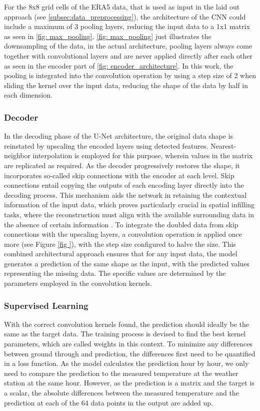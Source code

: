 For the 8x8 grid cells of the ERA5 data, that is used as input in the laid out approach (see \autoref{subsec:data_preprocessing}), the architecture of the CNN could include a maximum of 3 pooling layers, reducing the input data to a 1x1 matrix as seen in \autoref{fig: max_pooling}. \autoref{fig: max_pooling} just illustrates the downsampling of the data, in the actual architecture, pooling layers always come together with convolutional layers and are never applied directly after each other as seen in the encoder part of \autoref{fig: encoder_architecture}.
In this work, the pooling is integrated into the convolution operation by using a step size of 2 when sliding the kernel over the input data, reducing the shape of the data by half in each dimension.

\subsubsection*{Decoder}

In the decoding phase of the U-Net architecture, the original data shape is reinstated by upscaling the encoded layers using detected features. Nearest-neighbor interpolation is employed for this purpose, wherein values in the matrix are replicated as required.
As the decoder progressively restores the shape, it incorporates so-called skip connections with the encoder at each level. Skip connections entail copying the outputs of each encoding layer directly into the decoding process.
This mechanism aids the network in retaining the contextual information of the input data, which proves particularly crucial in spatial infilling tasks, where the reconstruction must align with the available surrounding data in the absence of certain information \cite{liu2018inpaining}.
To integrate the doubled data from skip connections with the upscaling layers, a convolution operation is applied once more (see Figure \ref{fig
}), with the step size configured to halve the size.
This combined architectural approach ensures that for any input data, the model generates a prediction of the same shape as the input, with the predicted values representing the missing data.
The specific values are determined by the parameters employed in the convolution kernels.

\subsubsection*{Supervised Learning}

With the correct convolution kernels found, the prediction should ideally be the same as the target data.
The training process is devised to find the best kernel parameters, which are called weights in this context.
To minimize any differences between ground through and prediction, the differences first need to be quantified in a loss function.
As the model calculates the prediction hour by hour, we only need to compare the prediction to the measured temperature at the weather station at the same hour.
However, as the prediction is a matrix and the target is a scalar, the absolute differences between the measured temperature and the prediction at each of the 64 data points in the output are added up. 

